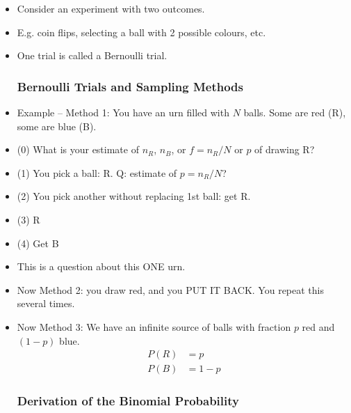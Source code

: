 \begin{itemize}
    \item Consider an experiment with two outcomes.
    \item E.g. coin flips, selecting a ball with 2 possible colours, etc.
    \item One trial is called a Bernoulli trial.

          \subsubsection*{Bernoulli Trials and Sampling Methods}

    \item Example -- Method 1: You have an urn filled with $N$ balls. Some are red (R), some are blue (B).
    \item (0) What is your estimate of $n_R$, $n_B$, or $f = n_R/N$ or $p$ of drawing R?
    \item (1) You pick a ball: R. Q: estimate of $p = n_R/N$?
    \item (2) You pick another without replacing 1st ball: get R.
    \item (3) R
    \item (4) Get B
    \item This is a question about this ONE urn.

    \item Now Method 2: you draw red, and you PUT IT BACK. You repeat this several times.
    \item Now Method 3: We have an infinite source of balls with fraction $p$ red and $(1-p)$ blue.
          \begin{align*}
              P(R) & = p   \\
              P(B) & = 1-p
          \end{align*}

          \subsubsection*{Derivation of the Binomial Probability}


\end{itemize}
